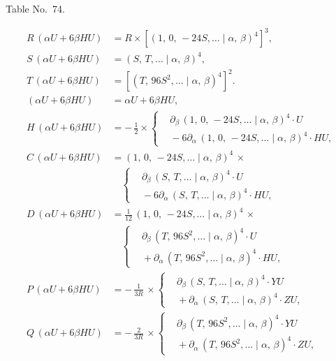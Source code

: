 \documentclass[11pt]{article}
\newcommand{\Cdel}{\mid}
\begin{document}
\begin{center}Table No.~74.\end{center}
\[
\begin{aligned}
   R\,(\alpha U + 6\beta H U) &= R\times[(1,\,0,\,-24 S,\ldots\Cdel\alpha,\,\beta)^4]^3,\\
   S\,(\alpha U + 6\beta H U) &= (S,\,T,\ldots\Cdel\alpha,\,\beta)^4,\\
   T\,(\alpha U + 6\beta H U) &= [(T,\,96 S^2,\ldots\Cdel\alpha,\,\beta)^4]^2.\\[6pt]
   (\alpha U + 6\beta H U) &= \alpha U + 6\beta H U,\\
   H\,(\alpha U + 6\beta H U) &= -\,\tfrac{1}{2}\times\left\{\begin{aligned}&\partial_\beta\,(1,\,0,\,-24 S,\ldots\Cdel\alpha,\,\beta)^4\cdot U\\ &{} - 6\partial_\alpha\,(1,\,0,\,-24 S,\ldots\Cdel\alpha,\,\beta)^4\cdot H U,\end{aligned}\right.\\
   C\,(\alpha U + 6\beta H U) &= (1,\,0,\,-24 S,\ldots\Cdel\alpha,\,\beta)^4\,\times\\
                              &\quad\left\{\begin{aligned}&\partial_\beta\,(S,\,T,\ldots\Cdel\alpha,\,\beta)^4\cdot U\\ &{} - 6\partial_\alpha\,(S,\,T,\ldots\Cdel\alpha,\,\beta)^4\cdot H U,\end{aligned}\right.\\
   D\,(\alpha U + 6\beta H U) &= \tfrac{1}{12}\,(1,\,0,\,-24 S,\ldots\Cdel\alpha,\,\beta)^4\,\times\\
                              &\quad\left\{\begin{aligned}&\partial_\beta\,(T,\,96 S^2,\ldots\Cdel\alpha,\,\beta)^4\cdot U\\ &{} + \partial_\alpha\,(T,\,96 S^2,\ldots\Cdel\alpha,\,\beta)^4\cdot H U,\end{aligned}\right.\\
   P\,(\alpha U + 6\beta H U) &= -\,\tfrac{1}{3 R}\,\times\left\{\begin{aligned}&\partial_\beta\,(S,\,T,\ldots\Cdel\alpha,\,\beta)^4\cdot Y U\\ &{} + \partial_\alpha\,(S,\,T,\ldots\Cdel\alpha,\,\beta)^4\cdot Z U,\end{aligned}\right.\\
   Q\,(\alpha U + 6\beta H U) &= -\,\tfrac{2}{3 R}\,\times\left\{\begin{aligned}&\partial_\beta\,(T,\,96 S^2,\ldots\Cdel\alpha,\,\beta)^4\cdot Y U\\ &{} + \partial_\alpha\,(T,\,96 S^2,\ldots\Cdel\alpha,\,\beta)^4\cdot Z U,\end{aligned}\right.\\

\end{aligned}\]
\end{document}
